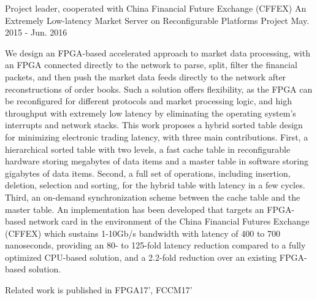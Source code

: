 \documentclass[11pt, a4paper]{awesome-cv}
\begin{document}
\begin{cventries}

  \cventry
    {Project leader, cooperated with China Financial Future Exchange (CFFEX)} %
    {An Extremely Low-latency Market Server on Reconfigurable Platforms} %
    {Project} %
    {May. 2015 - Jun. 2016} %
    {
      \begin{cvitems} %
        \item {We design an FPGA-based accelerated approach to market data processing, with an FPGA connected directly to the network to parse, split, filter the financial packets, and then push the market data feeds directly to the network after reconstructions of order books. Such a solution offers flexibility, as the FPGA can be reconfigured for different protocols and market processing logic, and high throughput with extremely low latency by eliminating the operating system's interrupts and network stacks. This work proposes a hybrid sorted table design for minimizing electronic trading latency, with three main contributions. First, a hierarchical sorted table with two levels, a fast cache table in reconfigurable hardware storing megabytes of data items and a master table in software storing gigabytes of data items. Second, a full set of operations, including insertion, deletion, selection and sorting, for the hybrid table with latency in a few cycles.  Third, an on-demand synchronization scheme between the cache table and the master table. An implementation has been developed that targets an FPGA-based network card in the environment of the China Financial Futures Exchange (CFFEX) which sustains 1-10Gb/s bandwidth with latency of 400 to 700 nanoseconds, providing an 80- to 125-fold latency reduction compared to a fully optimized CPU-based solution, and a 2.2-fold reduction over an existing FPGA-based solution.}
       \item {Related work is published in FPGA17', FCCM17'}
      \end{cvitems}
    }


\end{cventries}
\end{document}
